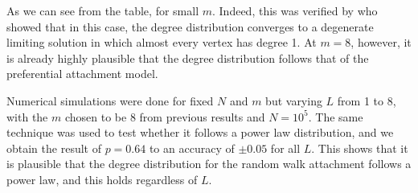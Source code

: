 As we can see from the table, for small $m$. Indeed, this was verified by \citet{Cannings2013} who showed that in this case, the degree distribution converges to a degenerate limiting solution in which almost every vertex has degree 1. At $m=8$, however, it is already highly plausible that the degree distribution follows that of the preferential attachment model. 

Numerical simulations were done for fixed $N$ and $m$ but varying $L$ from 1 to 8, with the $m$ chosen to be $8$ from previous results and $N = 10^5$. The same technique was used to test whether it follows a power law distribution, and we obtain the result of $p = 0.64$ to an accuracy of $\pm 0.05$ for all $L$. This shows that it is plausible that the degree distribution for the random walk attachment follows a power law, and this holds regardless of $L$. 